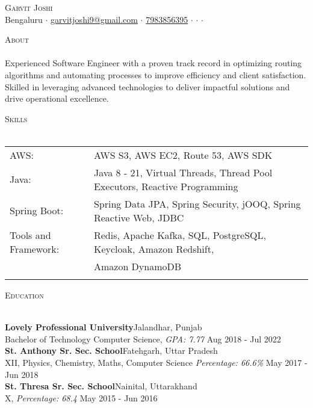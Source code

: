 \documentclass[a4paper]{article}
\newcommand{\lineunder} {
    \vspace*{-8pt} \\
    \hspace*{-18pt} \hrulefill \\
}
\newcommand{\header} [1] {
    {\hspace*{-18pt}\vspace*{6pt} \textsc{#1}}
    \vspace*{-6pt} \lineunder
}
\begin{document}
\vspace*{-40pt}

    

\vspace*{-10pt}
\begin{center}
	{\Huge \scshape {Garvit Joshi}}\\
	Bengaluru $\cdot$ \href{mailto:garvitjoshi9@gmail.com}{garvitjoshi9@gmail.com} $\cdot$ \href{tel:7983856395}{7983856395} $\cdot$ \href{https://garvit-joshi.github.io}{\faBriefcase} $\cdot$ \href{https://www.linkedin.com/in/garvitjoshi9/}{\faLinkedin} $\cdot$ \href{https://github.com/garvit-joshi/}{\faGithub}\\
\end{center}

\header{About}
Experienced Software Engineer with a proven track record in optimizing routing algorithms and automating processes to improve efficiency and client satisfaction. Skilled in leveraging advanced technologies to deliver impactful solutions and drive operational excellence.

\header{Skills}
\begin{tabular}{ l l }
	AWS:                  & AWS S3, AWS EC2, Route 53, AWS SDK                                            \\
	Java:                 & Java 8 - 21, Virtual Threads, Thread Pool Executors, Reactive Programming \\
	Spring Boot:          & Spring Data JPA, Spring Security, jOOQ, Spring Reactive Web, JDBC         \\
    Tools and Framework:   & Redis, Apache Kafka, SQL, PostgreSQL, Keycloak, Amazon Redshift, \\& Amazon DynamoDB \\         \\
\end{tabular}
\vspace{1mm}

\header{Education}
\vspace{1mm}

\textbf{Lovely Professional University}\hfill Jalandhar, Punjab\\
Bachelor of Technology Computer Science, \textit{GPA: 7.77} \hfill Aug 2018 - Jul 2022\\
\vspace{2mm}
\textbf{St. Anthony Sr. Sec. School}\hfill Fatehgarh, Uttar Pradesh\\
XII, Physics, Chemistry, Maths, Computer Science \textit{Percentage: 66.6\%} \hfill May 2017 - Jun 2018\\
\vspace{2mm}
\textbf{St. Thresa Sr. Sec. School}\hfill Nainital, Uttarakhand\\
X, \textit{Percentage: 68.4} \hfill May 2015 - Jun 2016\\
\vspace{1mm}
\end{document}

